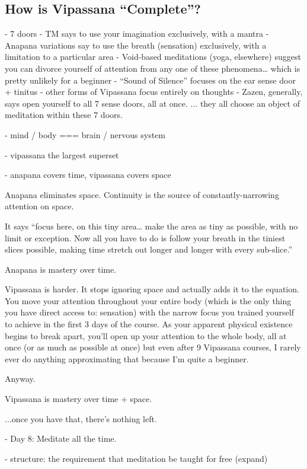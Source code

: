 \documentclass[a4paper, amsfonts, amssymb, amsmath, reprint, showkeys, nofootinbib, twoside]{revtex4-1}
\begin{document}
\subsection{How is Vipassana ``Complete''?}

- 7 doors
- TM says to use your imagination exclusively, with a mantra
- Anapana variations say to use the breath (sensation) exclusively, with a limitation to a particular area
- Void-based meditations (yoga, elsewhere) suggest you can divorce yourself of attention from any one of these phenomena… which is pretty unlikely for a beginner
- “Sound of Silence” focuses on the ear sense door + tinitus
- other forms of Vipassana focus entirely on thoughts
- Zazen, generally, says open yourself to all 7 sense doors, all at once.
... they all choose an object of meditation within these 7 doors.

- mind / body === brain / nervous system

- vipassana the largest superset

- anapana covers time, vipassana covers space

Anapana eliminates space. Continuity is the source of constantly-narrowing attention on space.

It says “focus here, on this tiny area… make the area as tiny as possible, with no
limit or exception. Now all you have to do is follow your breath in the tiniest
slices possible, making time stretch out longer and longer with every sub-slice.”


Anapana is mastery over time.

Vipassana is harder. It stops ignoring space and actually adds it to the equation. You move your attention throughout your entire body (which is the only thing you have direct access to: sensation) with the narrow focus you trained yourself to achieve in the first 3 days of the course. As your apparent physical existence begins to break apart, you’ll open up your attention to the whole body, all at once (or as much as possible at once) but even after 9 Vipassana courses, I rarely ever do anything approximating that because I’m quite a beginner. 🙂

Anyway.

Vipassana is mastery over time + space.

...once you have that, there’s nothing left.

- Day 8: Meditate all the time.

- structure: the requirement that meditation be taught for free (expand)
\end{document}

